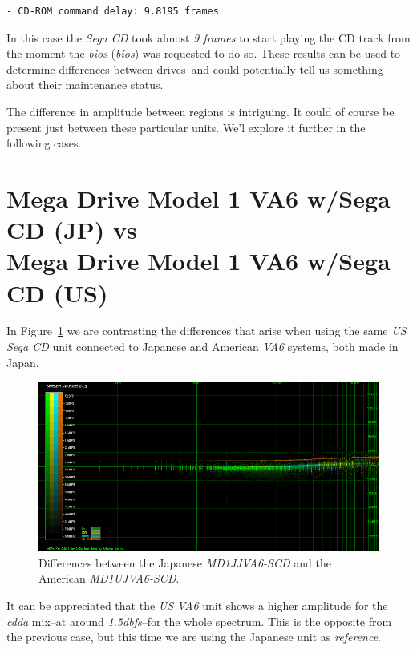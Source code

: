 \documentclass[10pt,a4paper]{report}
\newcommand{\define}[1]{\textit{\acrlong{#1}} (\textit{\acrshort{#1}})}
\newcommand{\ac}[1]{\textit{\mbox{\acrshort{#1}}}}
\newcommand{\db}[1]{\textit{\mbox{#1\acrshort{dbfs}}}}
\begin{document}
\begin{verbatim}
- CD-ROM command delay: 9.8195 frames
\end{verbatim}

In this case the \textit{Sega CD} took almost \textit{9 frames} to start playing the CD track from the moment the \define{bios} was requested to do so. These results can be used to determine differences between drives--and could potentially tell us something about their maintenance status.

The difference in amplitude between regions is intriguing. It could of course be present just between these particular units. We'l explore it further in the following cases.

\section{Mega Drive Model 1 VA6 w/Sega CD (JP) vs\\ Mega Drive Model 1 VA6 w/Sega CD (US)}

In Figure~\ref{fig:A-MD1JJVA6-SCD-LA_vs_A-MD1UJVA6-SCD} we are contrasting the differences that arise when using the same \textit{US Sega CD} unit connected to Japanese and American \textit{VA6} systems, both made in Japan.

\begin{figure}[H]
	\centering
	\includegraphics[width=1.0\linewidth]{images/results/11-A-MD1JJVA6-SCD-LA_vs_A-MD1UJVA6-SCD.png}
	\caption[A-MD1JJVA6-SCD-LA vs A-MD1UJVA6-SCD]{Differences between the Japanese \textit{MD1JJVA6-SCD} and the American \textit{MD1UJVA6-SCD}.}
	\label{fig:A-MD1JJVA6-SCD-LA_vs_A-MD1UJVA6-SCD}
\end{figure}

It can be appreciated that the \textit{US VA6} unit shows a higher amplitude for the \ac{cdda} mix--at around \db{1.5}--for the whole spectrum. This is the opposite from the previous case, but this time we are using the Japanese unit as \textit{reference}.
\end{document}
